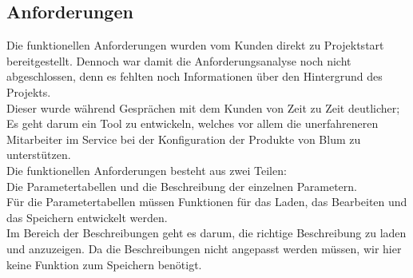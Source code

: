 \documentclass[12pt,a4paper]{article}
\begin{document}
\subsection{Anforderungen}
Die funktionellen Anforderungen wurden vom Kunden direkt zu Projektstart bereitgestellt. Dennoch war damit die Anforderungsanalyse noch nicht abgeschlossen, denn es fehlten noch Informationen über den Hintergrund des Projekts. \\
Dieser wurde während Gesprächen mit dem Kunden von Zeit zu Zeit deutlicher; Es geht darum ein Tool zu entwickeln, welches vor allem die unerfahreneren Mitarbeiter im Service bei der Konfiguration der Produkte von Blum zu unterstützen.\\
Die funktionellen Anforderungen besteht aus zwei Teilen: \\
Die Parametertabellen und die Beschreibung der einzelnen Parametern.\\
Für die Parametertabellen müssen Funktionen für das Laden, das Bearbeiten und das Speichern entwickelt werden.\\
Im Bereich der Beschreibungen geht es darum, die richtige Beschreibung zu laden und anzuzeigen. Da die Beschreibungen nicht angepasst werden müssen, wir hier keine Funktion zum Speichern benötigt.
\end{document}
